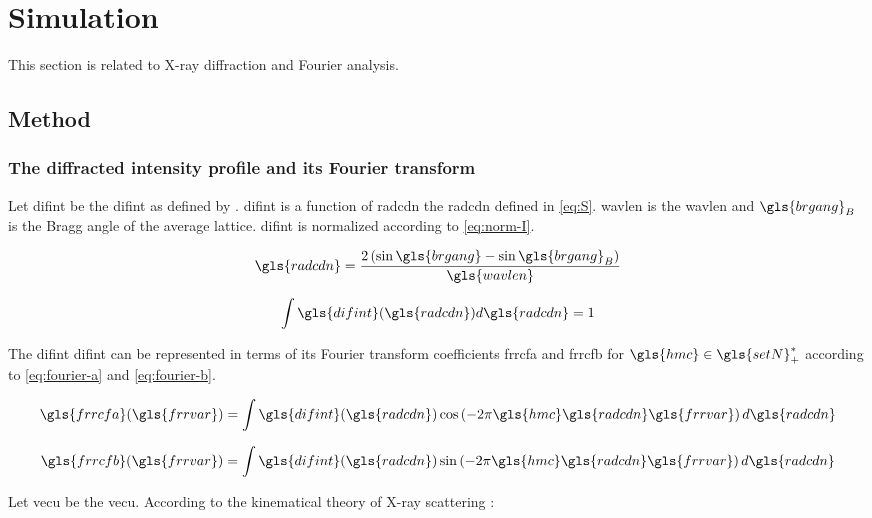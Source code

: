 \section{Simulation}

This section is related to X-ray diffraction and Fourier analysis.

\subsection{Method}

\subsubsection{The diffracted intensity profile and its Fourier transform}

Let \gls{difint} be the \glsdesc{difint} as defined by \textcite{W1979}.
\gls{difint} is a function of \gls{radcdn} the \glsdesc{radcdn} defined in \eqref{eq:S}.
\gls{wavlen} is the \glsdesc{wavlen} and \( \gls{brgang}_B \) is the Bragg angle of the average lattice.
\gls{difint} is normalized according to \eqref{eq:norm-I}.

\begin{equation}\label{eq:S}
\gls{radcdn} = \frac{2 \left( \sin \gls{brgang} - \sin \gls{brgang}_B \right)}{\gls{wavlen}}
\end{equation}

\begin{equation}\label{eq:norm-I}
\int \gls{difint}(\gls{radcdn}) d\gls{radcdn} = 1
\end{equation}

The \glsdesc{difint} \gls{difint} can be represented in terms of its Fourier transform coefficients \gls{frrcfa} and \gls{frrcfb} for \( {\gls{hmc}} \in \gls{setN}^*_+ \) according to \eqref{eq:fourier-a} and \eqref{eq:fourier-b}.

\begin{equation}\label{eq:fourier-a}
\gls{frrcfa}(\gls{frrvar}) = \int \gls{difint}(\gls{radcdn}) \cos \left( -2 \pi \gls{hmc} \gls{radcdn} \gls{frrvar} \right) d\gls{radcdn}
\end{equation}

\begin{equation}\label{eq:fourier-b}
\gls{frrcfb}(\gls{frrvar}) = \int \gls{difint}(\gls{radcdn}) \sin \left( -2 \pi \gls{hmc} \gls{radcdn} \gls{frrvar} \right) d\gls{radcdn}
\end{equation}

Let \gls{vecu} be the \glsdesc{vecu}.
According to the kinematical theory of X-ray scattering \cite{W1990}:

